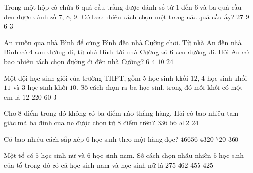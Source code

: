 \begin{ex}%
	Trong một hộp có chứa $6$ quả cầu trắng được đánh số từ $1$ đến $6$ và ba quả cầu đen được đánh số $7$, $8$, $9$. Có bao nhiêu cách chọn một trong các quả cầu ấy?
	\choice
	{$27$}
	{\True $9$}
	{$6$}
	{$3$}
\end{ex}

\begin{ex}%
	An muốn qua nhà Bình để cùng Bình đến nhà Cường chơi. Từ nhà An đến nhà Bình có $4$ con đường đi, từ nhà Bình tới nhà Cường có $6$ con đường đi. Hỏi An có bao nhiêu cách chọn đường đi đến nhà Cường?
	\choice
	{$6$}
	{$4$}
	{$10$}
	{$24$}
\end{ex}

\begin{ex}%
	Một đội học sinh giỏi của trường THPT, gồm $5$ học sinh khối $12$, $4$ học sinh khối $11$ và $3$ học sinh khối $10$. Số cách chọn ra ba học sinh trong đó mỗi khối có một em là
	\choice
	{$12$}
	{$220$}
	{\True $60$}
	{$3$}
\end{ex}

\begin{ex}%
Cho $8$ điểm trong đó không có ba điểm nào thẳng hàng. Hỏi có bao nhiêu tam giác mà ba đỉnh của nó được chọn từ $8$ điểm trên?	
	\choice
	{$336$}
	{\True $56$}
	{$512$}
	{$24$}
\end{ex}

\begin{ex}%
	Có bao nhiêu cách sắp xếp $6$ học sinh theo một hàng dọc?
	\choice
	{$46656$}
	{$4320$}
	{$720$}
	{$360$}
\end{ex}
\begin{ex}%
	Một tổ có $5$ học sinh nữ và $6$ học sinh nam. Số cách chọn nhẫu nhiên $5$ học sinh của tổ trong đó có cả học sinh nam và học sinh nữ là
	\choice
	{$275$}
	{$462$}
	{\True $455$}
	{$425$}
\end{ex}

